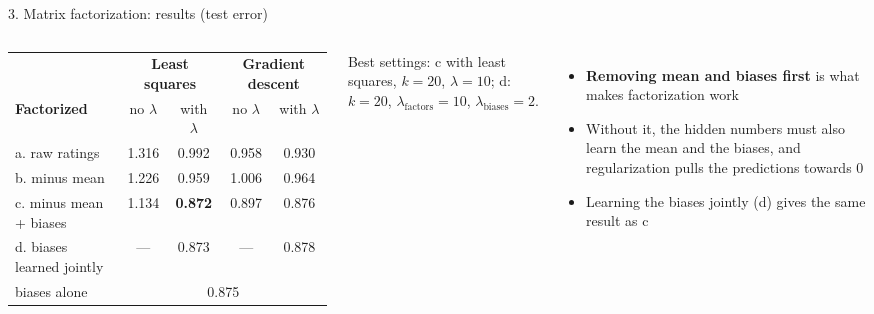 \documentclass[aspectratio=169,11pt]{beamer}
\newcommand{\key}[1]{\textcolor{accent}{\textbf{#1}}}
\newcommand{\muted}[1]{\textcolor{soft}{#1}}
\begin{document}
\begin{frame}{3. Matrix factorization: results (test error)}
\begin{columns}[c]
\footnotesize\setlength{\tabcolsep}{4pt}
\begin{tabular}{@{}lcccc@{}}
\toprule
 & \multicolumn{2}{c}{\textbf{Least squares}} & \multicolumn{2}{c}{\textbf{Gradient descent}} \\
\textbf{Factorized} & no $\lambda$ & with $\lambda$ & no $\lambda$ & with $\lambda$ \\
\midrule
a. raw ratings & 1.316 & 0.992 & 0.958 & 0.930 \\
b. minus mean & 1.226 & 0.959 & 1.006 & 0.964 \\
c. minus mean + biases & 1.134 & \key{0.872} & 0.897 & 0.876 \\
d. biases learned jointly & --- & 0.873 & --- & 0.878 \\
\midrule
\muted{biases alone} & \multicolumn{4}{c}{\muted{0.875}} \\
\bottomrule
\end{tabular}

\vspace{0.4em}
\muted{\footnotesize Best settings: c with least squares, $k = 20$, $\lambda = 10$;
d: $k = 20$, $\lambda_{\text{factors}} = 10$, $\lambda_{\text{biases}} = 2$.}
\begin{itemize}\small
  \item \key{Removing mean and biases first} is what makes factorization work
  \item Without it, the hidden numbers must also learn the mean and the biases, and regularization pulls the predictions towards 0
  \item Learning the biases jointly (d) gives the same result as c
\end{itemize}
\end{columns}
\end{frame}
\end{document}
